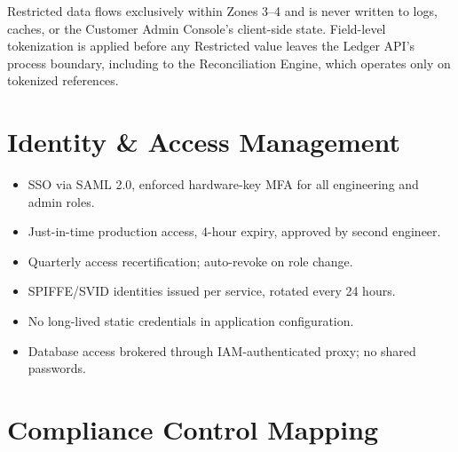 \documentclass[11pt,a4paper,parskip=half]{scrreprt}
\begin{document}
Restricted data flows exclusively within Zones 3--4 and is never written to logs, caches, or the
Customer Admin Console's client-side state. Field-level tokenization is applied before any
Restricted value leaves the Ledger API's process boundary, including to the Reconciliation
Engine, which operates only on tokenized references.

\section{Identity \& Access Management}

\begin{minipage}[t]{0.48\textwidth}
\begin{tcolorbox}[colback=white,colframe=steel,arc=2pt,title={\sffamily\small Human Access},
  colbacktitle=steel, coltitle=white, boxrule=0.6pt]
\small
\begin{itemize}[leftmargin=1.4em]
\item SSO via SAML 2.0, enforced hardware-key MFA for all engineering and admin roles.
\item Just-in-time production access, 4-hour expiry, approved by second engineer.
\item Quarterly access recertification; auto-revoke on role change.
\end{itemize}
\end{tcolorbox}
\end{minipage}\hfill
\begin{minipage}[t]{0.48\textwidth}
\begin{tcolorbox}[colback=white,colframe=steel,arc=2pt,title={\sffamily\small Workload Access},
  colbacktitle=steel, coltitle=white, boxrule=0.6pt]
\small
\begin{itemize}[leftmargin=1.4em]
\item SPIFFE/SVID identities issued per service, rotated every 24 hours.
\item No long-lived static credentials in application configuration.
\item Database access brokered through IAM-authenticated proxy; no shared passwords.
\end{itemize}
\end{tcolorbox}
\end{minipage}
\par

\section{Compliance Control Mapping}
\label{sec:compliance}
\end{document}
